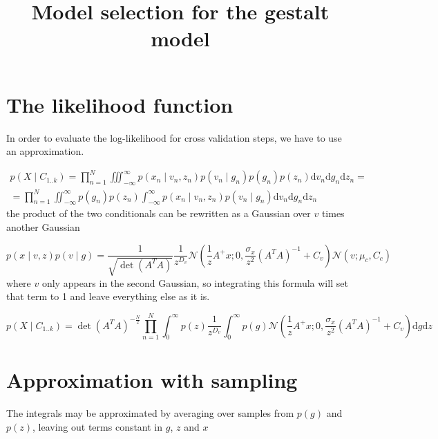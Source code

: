 \documentclass{paper}
\begin{document}
\title{Model selection for the gestalt model}
\maketitle

\section{The likelihood function}

In order to evaluate the log-likelihood for cross validation steps, we have to use an approximation.

\begin{equation}
\begin{split}
p(X \mid C_{1..k}) = \prod_{n=1}^N \iiint_{-\infty}^{\infty} p(x_n \mid v_n,z_n) p(v_n \mid g_n) p(g_n) p(z_n) \mathrm{d}v_n\mathrm{d}g_n\mathrm{d}z_n = \\
= \prod_{n=1}^N \iint_{-\infty}^{\infty}  p(g_n) p(z_n) \int_{-\infty}^{\infty} p(x_n \mid v_n,z_n) p(v_n \mid g_n) \mathrm{d}v_n\mathrm{d}g_n \mathrm{d}z_n
\end{split}
\end{equation}
%
the product of the two conditionals can be rewritten as a Gaussian over $v$ times another Gaussian

\begin{equation} 
p(x \mid v,z) p(v \mid g) = \frac{1}{\sqrt{\det(A^TA)}} \frac{1}{z^{D_v}} \mathcal{N}(\frac{1}{z}A^{+}x;0,\frac{\sigma_x}{z^2} (A^TA)^{-1} + C_v) \mathcal{N}(v; \mu_c,C_c)
\end{equation}
%
where $v$ only appears in the second Gaussian, so integrating this formula will set that term to 1 and leave everything else as it is.

\begin{equation}
p(X \mid C_{1..k}) =  \det(A^T A)^{-\frac{N}{2}} \prod_{n=1}^N \int_{0}^{\infty} p(z) \frac{1}{z^{D_v}}  \int_{0}^{\infty}  p(g) \mathcal{N}(\frac{1}{z} A^{+}x; 0,\frac{\sigma_x}{z^2} (A^T A)^{-1} + C_v) \mathrm{d}g \mathrm{d}z
\end{equation}

\section{Approximation with sampling}

The integrals may be approximated by averaging over samples from $p(g)$ and $p(z)$, leaving out terms constant in $g$, $z$ and $x$
\end{document}
